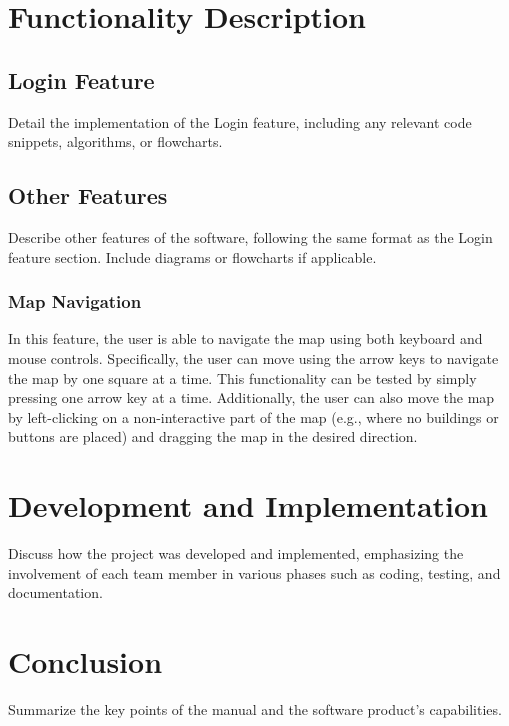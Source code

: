 \documentclass[12pt]{article}
\begin{document}
\section{Functionality Description}
\subsection{Login Feature}
Detail the implementation of the Login feature, including any relevant code snippets, algorithms, or flowcharts.

\subsection{Other Features}
Describe other features of the software, following the same format as the Login feature section. Include diagrams or flowcharts if applicable.

\subsubsection{Map Navigation}
In this feature, the user is able to navigate the map using both keyboard and mouse controls. Specifically, the user can move using the arrow keys to navigate the map by one square at a time. This functionality can be tested by simply pressing one arrow key at a time. Additionally, the user can also move the map by left-clicking on a non-interactive part of the map (e.g., where no buildings or buttons are placed) and dragging the map in the desired direction.

\section{Development and Implementation}
Discuss how the project was developed and implemented, emphasizing the involvement of each team member in various phases such as coding, testing, and documentation.

\section{Conclusion}
Summarize the key points of the manual and the software product's capabilities.
\end{document}
